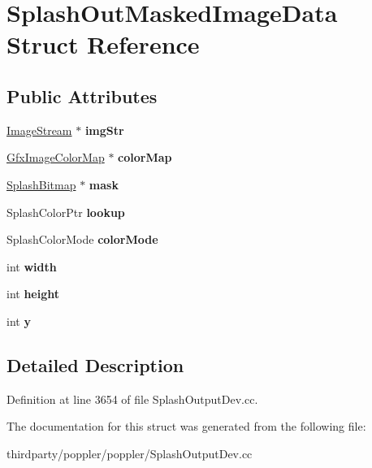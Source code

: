 \hypertarget{struct_splash_out_masked_image_data}{}\section{Splash\+Out\+Masked\+Image\+Data Struct Reference}
\label{struct_splash_out_masked_image_data}
\subsection*{Public Attributes}
\begin{DoxyCompactItemize}
\item 
\mbox{\label{struct_splash_out_masked_image_data_af22f870ab85fd7cf597132ac1b41bdea}} 
\hyperlink{class_image_stream}{Image\+Stream} $\ast$ {\bfseries img\+Str}
\item 
\mbox{\label{struct_splash_out_masked_image_data_a3a1899be6c09979f5f1e94962b8c9ff7}} 
\hyperlink{class_gfx_image_color_map}{Gfx\+Image\+Color\+Map} $\ast$ {\bfseries color\+Map}
\item 
\mbox{\label{struct_splash_out_masked_image_data_ad232672540b050eb0f93aff91f8d4012}} 
\hyperlink{class_splash_bitmap}{Splash\+Bitmap} $\ast$ {\bfseries mask}
\item 
\mbox{\label{struct_splash_out_masked_image_data_a783ef0e934e4167987fbf1e01ba36bd2}} 
Splash\+Color\+Ptr {\bfseries lookup}
\item 
\mbox{\label{struct_splash_out_masked_image_data_a4a397dbe3d36b7509ed38cbacf431282}} 
Splash\+Color\+Mode {\bfseries color\+Mode}
\item 
\mbox{\label{struct_splash_out_masked_image_data_ab9cbab66fc7a4ea804bdeba7f8477cef}} 
int {\bfseries width}
\item 
\mbox{\label{struct_splash_out_masked_image_data_aa772b79ffd9edeac5c3933520b7d6aa4}} 
int {\bfseries height}
\item 
\mbox{\label{struct_splash_out_masked_image_data_a48a6584138e35b2346a414839199c8c7}} 
int {\bfseries y}
\end{DoxyCompactItemize}


\subsection{Detailed Description}


Definition at line 3654 of file Splash\+Output\+Dev.\+cc.



The documentation for this struct was generated from the following file\+:\begin{DoxyCompactItemize}
\item 
thirdparty/poppler/poppler/Splash\+Output\+Dev.\+cc\end{DoxyCompactItemize}
